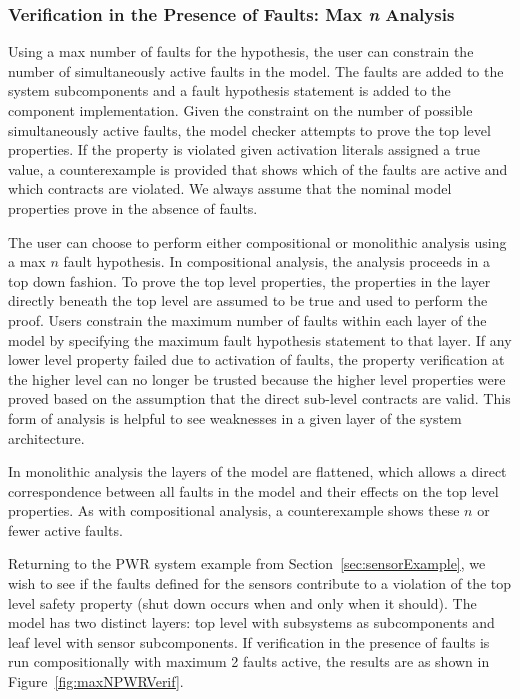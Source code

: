 \subsubsection{Verification in the Presence of Faults: Max \textit{n} Analysis}
Using a max number of faults for the hypothesis, the user can constrain the number of simultaneously active faults in the model. The faults are added to the system subcomponents and a fault hypothesis statement is added to the component implementation. Given the constraint on the number of possible simultaneously active faults, the model checker attempts to prove the top level properties. If the property is violated given activation literals assigned a true value, a counterexample is provided that shows which of the faults are active and which contracts are violated. We always assume that the nominal model properties prove in the absence of faults.

The user can choose to perform either compositional or monolithic analysis using a max $n$ fault hypothesis. In compositional analysis, the analysis proceeds in a top down fashion. To prove the top level properties, the properties in the layer directly beneath the top level are assumed to be true and used to perform the proof. Users constrain the maximum number of faults within each layer of the model by specifying the maximum fault hypothesis statement to that layer. If any lower level property failed due to activation of faults, the property verification at the higher level can no longer be trusted because the higher level properties were proved based on the assumption that the direct sub-level contracts are valid. This form of analysis is helpful to see weaknesses in a given layer of the system architecture. 

In monolithic analysis the layers of the model are flattened, which allows a direct correspondence between all faults in the model and their effects on the top level properties. As with compositional analysis, a counterexample shows these $n$ or fewer active faults. 

Returning to the PWR system example from Section~\ref{sec:sensorExample}, we wish to see if the faults defined for the sensors contribute to a violation of the top level safety property (shut down occurs when and only when it should). The model has two distinct layers: top level with subsystems as subcomponents and leaf level with sensor subcomponents. If verification in the presence of faults is run compositionally with maximum 2 faults active, the results are as shown in Figure~\ref{fig:maxNPWRVerif}. 

